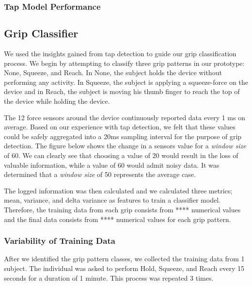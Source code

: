 \subsubsection{Tap Model Performance}

\subsection{Grip Classifier}
We used the insights gained from tap detection to guide our grip classification process. We begin by attempting to classify three grip patterns in our prototype: None, Squeeze, and Reach. In None, the subject holds the device without performing any activity. In Squeeze, the subject is applying a squeeze-force on the device and in Reach, the subject is moving his thumb finger to reach the top of the device while holding the device.  
\par
The 12 force sensors around the device continuously reported data every 1 ms on average. Based on our experience with tap detection, we felt that these values could be safely aggregated into a 20ms sampling interval for the purpose of grip detection. The figure below %
shows the change in a sensors value for a \textit{window size} of 60. We can clearly see that choosing a value of 20 would result in the loss of valuable information, while a value of 60 would admit noisy data. It was determined that a \textit{window size} of 50 represents the average case.

 The logged information was then calculated  and we calculated three metrics; mean, variance, and delta variance as features to train a classifier model. Therefore, the training data from each grip consists from **** numerical values and the final data consists from **** numerical values for each grip pattern.

\subsubsection{Variability of Training Data}
After we identified the grip pattern classes, we collected the training data from 1 subject. The individual was asked to perform Hold, Squeeze, and Reach every 15 seconds for a duration of 1 minute. This process was repeated 3 times.

    